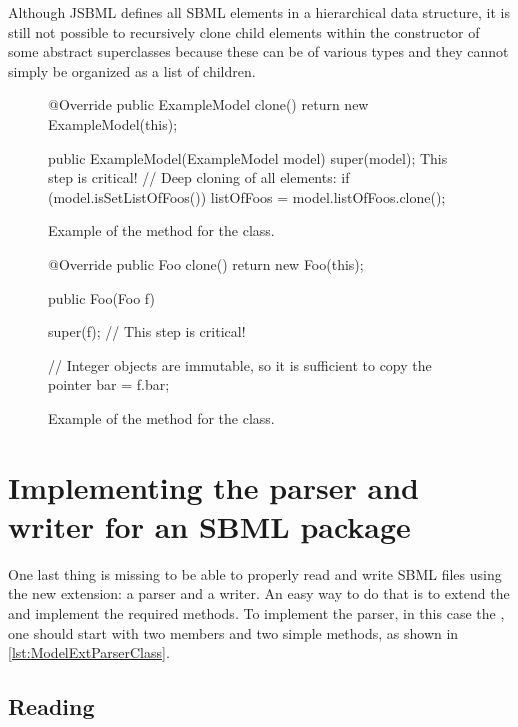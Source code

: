 Although JSBML defines all SBML elements in a hierarchical data structure, it
is still not possible to recursively clone child elements within the
constructor of some abstract superclasses because these can be of various
types and they cannot simply be organized as a list of children.

\begin{figure}[htb]
  \begin{example}[numbers=left]
@Override public ExampleModel clone() {
  return new ExampleModel(this);
}

public ExampleModel(ExampleModel model) {
  super(model);  This step is critical!
  // Deep cloning of all elements:
  if (model.isSetListOfFoos()) {
    listOfFoos = model.listOfFoos.clone();
  }
}\end{example}
 \caption{Example of the  method for the  class.}
 \label{lst:ModelExtClone}
\end{figure}

\begin{figure}[htb]
  \begin{example}[numbers=left]
@Override public Foo clone() {
  return new Foo(this);
}

public Foo(Foo f) {
  super(f);  // This step is critical!

  // Integer objects are immutable, so it is sufficient to copy the pointer
  bar = f.bar;
}\end{example}
  \caption{Example of the  method for the  class.}
  \label{lst:ModelExtCloneFoo}
\end{figure}


\section{Implementing the parser and writer for an SBML package}

One last thing is missing to be able to properly read and write SBML files
using the new extension: a parser and a writer. An easy way to do that is
to extend the \AbstractReaderWriter and implement the required methods. To
implement the parser, in this case the , one should
start with two members and two simple methods, as shown in
\vref{lst:ModelExtParserClass}.


\subsection{Reading}

